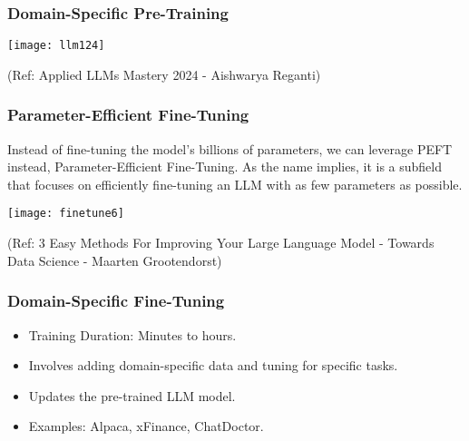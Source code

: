 \begin{frame}[fragile]\frametitle{Domain-Specific Pre-Training}

\begin{center}
\texttt{[image: llm124]}
\end{center}				

{\tiny (Ref: Applied LLMs Mastery 2024 - Aishwarya Reganti)}

\end{frame}

\begin{frame}[fragile]\frametitle{Parameter-Efficient Fine-Tuning}

Instead of fine-tuning the model's billions of parameters, we can leverage PEFT instead, Parameter-Efficient Fine-Tuning. As the name implies, it is a subfield that focuses on efficiently fine-tuning an LLM with as few parameters as possible.

		\begin{center}
		\texttt{[image: finetune6]}
		\end{center}

{\tiny (Ref: 3 Easy Methods For Improving Your Large Language Model - Towards Data Science - Maarten Grootendorst)}

\end{frame}

\begin{frame}[fragile]\frametitle{Domain-Specific Fine-Tuning}

      \begin{itemize}
        \item Training Duration: Minutes to hours.
        \item Involves adding domain-specific data and tuning for specific tasks.
        \item Updates the pre-trained LLM model.
        \item Examples: Alpaca, xFinance, ChatDoctor.
      \end{itemize}

\end{frame}

